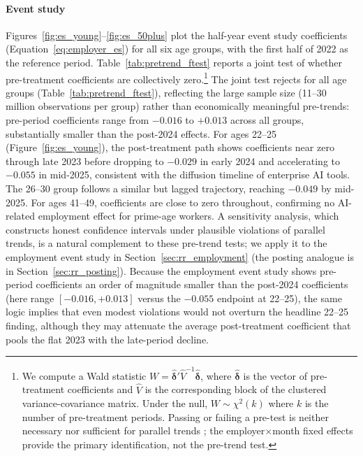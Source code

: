 \documentclass[preprint,12pt,authoryear]{elsarticle}
\begin{document}
\paragraph{Event study}
Figures~\ref{fig:es_young}--\ref{fig:es_50plus} plot the half-year event study coefficients (Equation~\ref{eq:employer_es}) for all six age groups, with the first half of 2022 as the reference period. Table~\ref{tab:pretrend_ftest} reports a joint test of whether pre-treatment coefficients are collectively zero.\footnote{We compute a Wald statistic $W = \hat{\boldsymbol{\delta}}' \hat{V}^{-1} \hat{\boldsymbol{\delta}}$, where $\hat{\boldsymbol{\delta}}$ is the vector of pre-treatment coefficients and $\hat{V}$ is the corresponding block of the clustered variance-covariance matrix. Under the null, $W \sim \chi^2(k)$ where $k$ is the number of pre-treatment periods. Passing or failing a pre-test is neither necessary nor sufficient for parallel trends \citep{roth2022pretest}; the employer$\times$month fixed effects provide the primary identification, not the pre-trend test.} The joint test rejects for all age groups (Table~\ref{tab:pretrend_ftest}), reflecting the large sample size (11--30 million observations per group) rather than economically meaningful pre-trends: pre-period coefficients range from $-0.016$ to $+0.013$ across all groups, substantially smaller than the post-2024 effects. For ages 22--25 (Figure~\ref{fig:es_young}), the post-treatment path shows coefficients near zero through late 2023 before dropping to $-0.029$ in early 2024 and accelerating to $-0.055$ in mid-2025, consistent with the diffusion timeline of enterprise AI tools. The 26--30 group follows a similar but lagged trajectory, reaching $-0.049$ by mid-2025. For ages 41--49, coefficients are close to zero throughout, confirming no AI-related employment effect for prime-age workers. A \citet{rambachan2023more} sensitivity analysis, which constructs honest confidence intervals under plausible violations of parallel trends, is a natural complement to these pre-trend tests; we apply it to the employment event study in Section~\ref{sec:rr_employment} (the posting analogue is in Section~\ref{sec:rr_posting}). Because the employment event study shows pre-period coefficients an order of magnitude smaller than the post-2024 coefficients (here range $[-0.016,+0.013]$ versus the $-0.055$ endpoint at 22--25), the same logic implies that even modest violations would not overturn the headline 22--25 finding, although they may attenuate the average post-treatment coefficient that pools the flat 2023 with the late-period decline.
\end{document}
